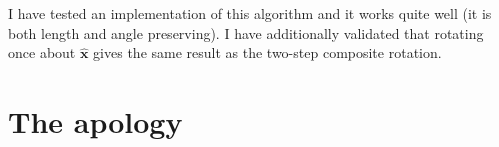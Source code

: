 \documentclass[12pt, nofootinbib, notitlepage]{revtex4-1}
\renewcommand{\vec}[1]{\boldsymbol{#1}}
\newcommand{\vecN}[1]{\vec{\hat{#1}}}
\newcommand{\ax}{\vecN{x}}
\begin{document}

I have tested an implementation of this algorithm and it works quite well
(it is both length and angle preserving). 
I have additionally validated that rotating once about $\ax$ gives 
the same result as the two-step composite rotation.

\appendix*
\section{The apology}
\end{document}
